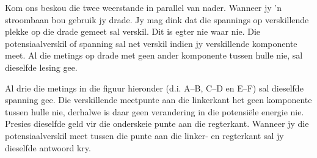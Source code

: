 Kom ons beskou die twee weerstande in parallel van nader. Wanneer jy 'n
stroombaan bou gebruik jy drade. Jy mag dink dat die spannings op verskillende
plekke op die drade gemeet sal verskil. Dit is egter nie waar nie. Die
potensiaalverskil of spanning sal net verskil indien jy verskillende komponente
meet. Al die metings op drade met geen ander komponente tussen hulle nie, sal
dieselfde lesing gee.

Al drie die metings in die figuur hieronder (d.i. A--B, C--D en E--F) sal
dieselfde spanning gee. Die verskillende meetpunte aan die linkerkant het geen
komponente tussen hulle nie, derhalwe is daar geen verandering in die
potensi\"ele energie nie. Presies dieselfde geld vir die onderskeie punte aan
die regterkant. Wanneer jy die potensiaalverskil meet tussen die punte aan die
linker- en regterkant sal jy dieselfde antwoord kry.

